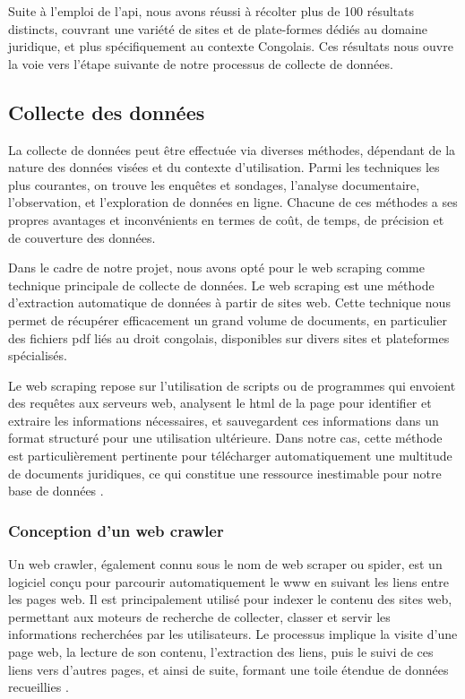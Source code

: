 Suite à l'emploi de l'\acs{api}, nous avons réussi à récolter plus de 100 résultats distincts, couvrant une variété de sites et de plate-formes dédiés au domaine juridique, et plus spécifiquement au contexte Congolais. Ces résultats nous ouvre la voie vers l'étape suivante de notre processus de collecte de données.

\subsection{Collecte des données}

La collecte de données peut être effectuée via diverses méthodes, dépendant de la nature des données visées et du contexte d'utilisation. Parmi les techniques les plus courantes, on trouve les enquêtes et sondages, l'analyse documentaire, l'observation, et l'exploration de données en ligne. Chacune de ces méthodes a ses propres avantages et inconvénients en termes de coût, de temps, de précision et de couverture des données.

Dans le cadre de notre projet, nous avons opté pour le web scraping comme technique principale de collecte de données. Le web scraping est une méthode d'extraction automatique de données à partir de sites web. Cette technique nous permet de récupérer efficacement un grand volume de documents, en particulier des fichiers \acs{pdf} liés au droit congolais, disponibles sur divers sites et plateformes spécialisés.

Le web scraping repose sur l'utilisation de scripts ou de programmes qui envoient des requêtes aux serveurs web, analysent le \acs{html} de la page pour identifier et extraire les informations nécessaires, et sauvegardent ces informations dans un format structuré pour une utilisation ultérieure. Dans notre cas, cette méthode est particulièrement pertinente pour télécharger automatiquement une multitude de documents juridiques, ce qui constitue une ressource inestimable pour notre base de données \cite{Chakrabarti_2002}.
 
\subsubsection{Conception d'un web crawler}

Un web crawler, également connu sous le nom de web scraper ou spider, est un logiciel conçu pour parcourir automatiquement le \ac{www} en suivant les liens entre les pages web. Il est principalement utilisé pour indexer le contenu des sites web, permettant aux moteurs de recherche de collecter, classer et servir les informations recherchées par les utilisateurs. Le processus implique la visite d'une page web, la lecture de son contenu, l'extraction des liens, puis le suivi de ces liens vers d'autres pages, et ainsi de suite, formant une toile étendue de données recueillies \cite{frwiki:205243717, Chakrabarti_2002, BRIN1998107}.

